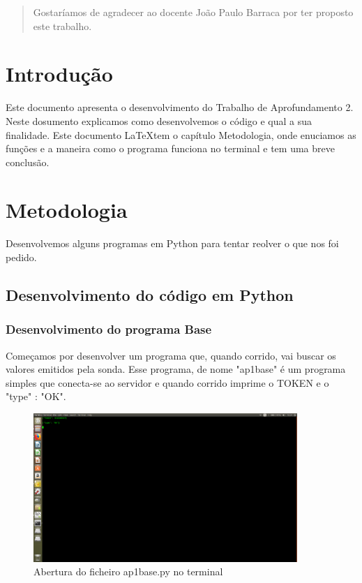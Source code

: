 \documentclass{report}
\begin{document}
\renewcommand{\abstractname}{Agradecimentos}
\begin{abstract}
Gostaríamos de agradecer ao docente João Paulo Barraca por ter proposto este trabalho.
\end{abstract}


\tableofcontents

\clearpage
{}

\chapter{Introdução}
\label{chap.introducao}

Este documento apresenta o desenvolvimento do Trabalho de Aprofundamento 2.
Neste dosumento explicamos como desenvolvemos o código e qual a sua finalidade.
Este documento \LaTeX tem o capítulo Metodologia, onde enuciamos as funções e a maneira como o programa funciona no terminal e tem uma breve conclusão.


\chapter{Metodologia}
\label{chap.metodologia}
Desenvolvemos alguns programas em Python para tentar reolver o que nos foi pedido.


\section{Desenvolvimento do código em Python}

\subsection{Desenvolvimento do programa Base}
Começamos por desenvolver um programa que, quando corrido, vai buscar os valores emitidos pela sonda.
Esse programa, de nome "ap1base" é um programa simples que conecta-se ao servidor e quando corrido imprime o TOKEN e o "type" : "OK".

\begin{figure}[h]
\center
\includegraphics[width=10cm]{Imagens/1.png}
\caption{Abertura do ficheiro ap1base.py no terminal}
\end{figure}
\end{document}
